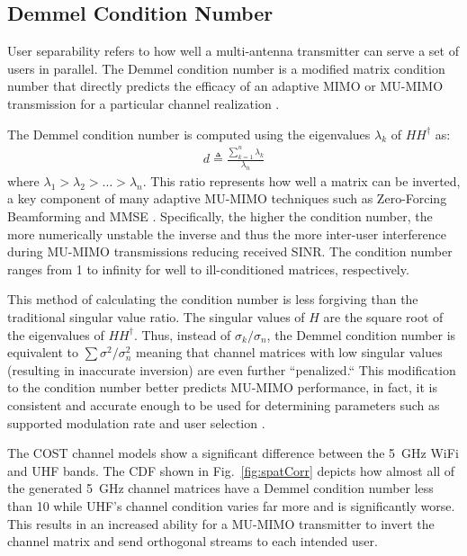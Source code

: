\subsection{Demmel Condition Number}
\label{sec:demmel}

User separability refers to how well a multi-antenna transmitter can serve a set of users in parallel.  
The Demmel condition number is a modified matrix condition number that directly predicts the efficacy of an adaptive MIMO or MU-MIMO transmission for a particular channel realization \cite{zhong2011distribution}.

The Demmel condition number is computed using the eigenvalues $\lambda_k$ of $HH^{\dagger}$ as:
\begin{align}
d\triangleq\frac{\sum^{n}_{k=1}{\lambda_k}}{\lambda_{n}}
\label{eq:dcond}
\end{align}
where $\lambda_1 > \lambda_2 > \hdots > \lambda_n$.
This ratio represents how well a matrix can be inverted, a key component of many adaptive MU-MIMO techniques such as Zero-Forcing Beamforming \cite{goldsmith2006zf} and MMSE \cite{tse2005fundamentals}.
Specifically, the higher the condition number, the more numerically unstable the inverse and thus the more inter-user interference during MU-MIMO transmissions reducing received SINR.  
The condition number ranges from 1 to infinity for well to ill-conditioned matrices, respectively.  

This method of calculating the condition number is less forgiving than the traditional singular value ratio. 
The singular values of $H$ are the square root of the eigenvalues of $HH^{\dagger}$.
Thus, instead of $\sigma_k/\sigma_n$, the Demmel condition number is equivalent to $\sum{\sigma^2}/\sigma_n^2$ meaning that channel matrices with low singular values (resulting in inaccurate inversion) are even further ``penalized.``
This modification to the condition number better predicts MU-MIMO performance, in fact, it is consistent and accurate enough to be used for determining parameters such as supported modulation rate and user selection \cite{zhong2011distribution}.


The COST channel models show a significant difference between the 5~GHz WiFi and UHF bands.  
The CDF shown in Fig.~\ref{fig:spatCorr} depicts how almost all of the generated 5~GHz channel matrices have a Demmel condition number less than 10 while UHF's channel condition varies far more and is significantly worse.
This results in an increased ability for a \ac{MU-MIMO} transmitter to invert the channel matrix and send orthogonal streams to each intended user. 


